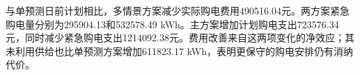 与单预测日前计划相比，多情景方案减少实际购电费用490516.04元。两方案紧急购电量分别为295904.13和532578.49 kWh。主方案增加计划购电支出723576.34元，同时减少紧急购电支出1214092.38元。费用改善来自这两项变化的净效应；其未利用供给也比单预测方案增加611823.17 kWh，表明更保守的购电安排仍有消纳代价。